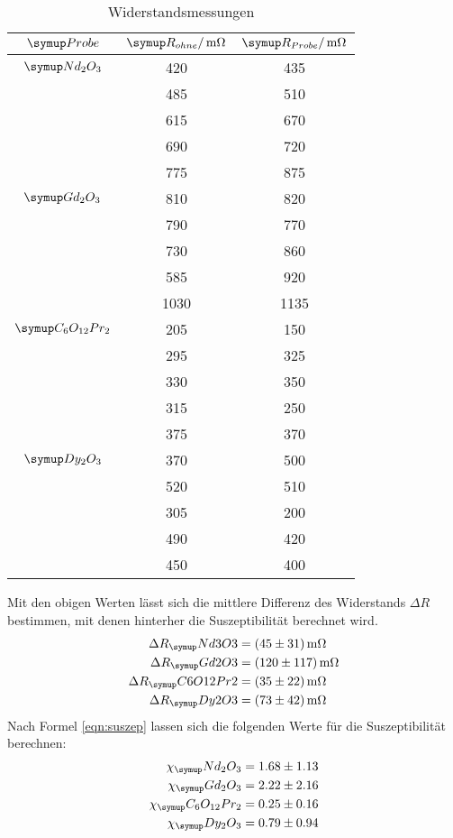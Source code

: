 \begin{table}
  \centering
  \begin{tabular}{c c c}
    \toprule
    $\su{Probe}$ & $\su{R_{ohne}/\mOhm}$ &$\su{R_{Probe}}/\mOhm$ \\
    \midrule
    $\su{Nd_2O_3}$   & 420 & 435 \\
                     & 485 & 510 \\
                     & 615 & 670 \\
                     & 690 & 720 \\
                     & 775 & 875 \\ \hline
    $\su{Gd_2O_3}$   & 810 & 820 \\
                     & 790 & 770 \\
                     & 730 & 860 \\
                     & 585 & 920 \\
                     &1030 &1135 \\ \hline
    $\su{C_6O_{12}Pr_2}$  & 205 & 150 \\
                          & 295 & 325 \\
                          & 330 & 350 \\
                          & 315 & 250 \\
                          & 375 & 370 \\ \hline
    $\su{Dy_2O_3}$   & 370 & 500 \\
                     & 520 & 510 \\
                     & 305 & 200 \\
                     & 490 & 420 \\
                     & 450 & 400 \\
    \bottomrule
  \end{tabular}
  \caption{Widerstandsmessungen}
  \label{tab:mess2}
\end{table}
Mit den obigen Werten lässt sich die mittlere Differenz des Widerstands
$\Delta R$ bestimmen, mit denen hinterher die Suszeptibilität berechnet wird.
\begin{align*}
  \Delta R_\su{Nd3O3}    &= ( 45 \pm  31) \mOhm \\
  \Delta R_\su{Gd2O3}    &= (120 \pm 117) \mOhm \\
  \Delta R_\su{C6O12Pr2} &= ( 35 \pm  22) \mOhm \\
  \Delta R_\su{Dy2O3}    &= ( 73 \pm  42) \mOhm
\end{align*}
Nach Formel \eqref{eqn:suszep} lassen sich die folgenden Werte für die Suszeptibilität
berechnen:
\begin{align*}
  \chi_\su{Nd_2O_3}       &= 1.68 \pm 1.13 \\
  \chi_\su{Gd_2O_3}       &= 2.22 \pm 2.16 \\
  \chi_\su{C_6O_{12}Pr_2} &= 0.25 \pm 0.16 \\
  \chi_\su{Dy_2O_3}       &= 0.79 \pm 0.94 %
\end{align*}
